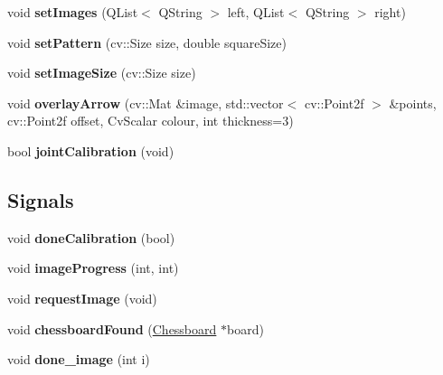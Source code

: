 \begin{DoxyCompactItemize}
\item 
\hypertarget{class_stereo_calibrate_a09d1ae49ef40584e222c977548bd74f8}{}void {\bfseries set\+Images} (Q\+List$<$ Q\+String $>$ left, Q\+List$<$ Q\+String $>$ right)\label{class_stereo_calibrate_a09d1ae49ef40584e222c977548bd74f8}

\item 
\hypertarget{class_stereo_calibrate_ae5859fd10b2abc8f9c6c46191199c9fb}{}void {\bfseries set\+Pattern} (cv\+::\+Size size, double square\+Size)\label{class_stereo_calibrate_ae5859fd10b2abc8f9c6c46191199c9fb}

\item 
\hypertarget{class_stereo_calibrate_ab7e823429a93bfc6b922b0250963a3f5}{}void {\bfseries set\+Image\+Size} (cv\+::\+Size size)\label{class_stereo_calibrate_ab7e823429a93bfc6b922b0250963a3f5}

\item 
\hypertarget{class_stereo_calibrate_a96b0cb2c8b225d1c7373f235d614f4a9}{}void {\bfseries overlay\+Arrow} (cv\+::\+Mat \&image, std\+::vector$<$ cv\+::\+Point2f $>$ \&points, cv\+::\+Point2f offset, Cv\+Scalar colour, int thickness=3)\label{class_stereo_calibrate_a96b0cb2c8b225d1c7373f235d614f4a9}

\item 
\hypertarget{class_stereo_calibrate_aac7cce8c777aff0eb5773804718c7f89}{}bool {\bfseries joint\+Calibration} (void)\label{class_stereo_calibrate_aac7cce8c777aff0eb5773804718c7f89}

\end{DoxyCompactItemize}
\subsection*{Signals}
\begin{DoxyCompactItemize}
\item 
\hypertarget{class_stereo_calibrate_ac3d8097c8d6a5c9fe8c97439716f13e7}{}void {\bfseries done\+Calibration} (bool)\label{class_stereo_calibrate_ac3d8097c8d6a5c9fe8c97439716f13e7}

\item 
\hypertarget{class_stereo_calibrate_a41525653d38ca4e2a45a6daf5dc45f08}{}void {\bfseries image\+Progress} (int, int)\label{class_stereo_calibrate_a41525653d38ca4e2a45a6daf5dc45f08}

\item 
\hypertarget{class_stereo_calibrate_ab1db6cd7acd48f9c7a34a76ce6aca340}{}void {\bfseries request\+Image} (void)\label{class_stereo_calibrate_ab1db6cd7acd48f9c7a34a76ce6aca340}

\item 
\hypertarget{class_stereo_calibrate_a3408cbc47f9926c5505cab7a0e0e7ddc}{}void {\bfseries chessboard\+Found} (\hyperlink{class_chessboard}{Chessboard} $\ast$board)\label{class_stereo_calibrate_a3408cbc47f9926c5505cab7a0e0e7ddc}

\item 
\hypertarget{class_stereo_calibrate_a29a79921e046abe6d70012c93a18533c}{}void {\bfseries done\+\_\+image} (int i)\label{class_stereo_calibrate_a29a79921e046abe6d70012c93a18533c}

\end{DoxyCompactItemize}
